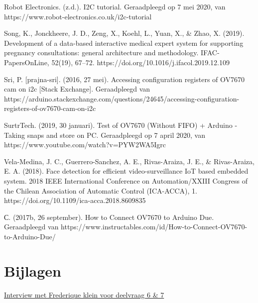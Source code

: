 \documentclass{article}
\begin{document}
Robot Electronics. (z.d.). I2C tutorial. Geraadpleegd op 7 mei 2020, van https://www.robot-electronics.co.uk/i2c-tutorial

Song, K., Jonckheere, J. D., Zeng, X., Koehl, L., Yuan, X., & Zhao, X. (2019). Development of a data-based interactive medical expert system for supporting pregnancy consultations: general architecture and methodology. IFAC-PapersOnLine, 52(19), 67–72. https://doi.org/10.1016/j.ifacol.2019.12.109

Sri, P. [prajna-sri]. (2016, 27 mei). Accessing configuration registers of OV7670 cam on i2c [Stack Exchange]. Geraadpleegd van https://arduino.stackexchange.com/questions/24645/accessing-configuration-registers-of-ov7670-cam-on-i2c

SurtrTech. (2019, 30 januari). Test of OV7670 (Without FIFO) + Arduino - Taking snaps and store on PC. Geraadpleegd op 7 april 2020, van https://www.youtube.com/watch?v=PYW2WA5Igrc

Vela-Medina, J. C., Guerrero-Sanchez, A. E., Rivas-Araiza, J. E., & Rivas-Araiza, E. A. (2018). Face detection for efficient video-surveillance IoT based embedded system. 2018 IEEE International Conference on Automation/XXIII Congress of the Chilean Association of Automatic Control (ICA-ACCA), 1. https://doi.org/10.1109/ica-acca.2018.8609835

С. (2017b, 26 september). How to Connect OV7670 to Arduino Due. Geraadpleegd van https://www.instructables.com/id/How-to-Connect-OV7670-to-Arduino-Due/

\section{Bijlagen}

\href{https://docs.google.com/document/d/1SsX8LF4RwbH1YNNYjNoLCvhxlJQ-Cs8OT3DVWehyQDE/edit?usp=sharing}{Interview met Frederique klein voor deelvraag 6 \& 7}



\end{document}
